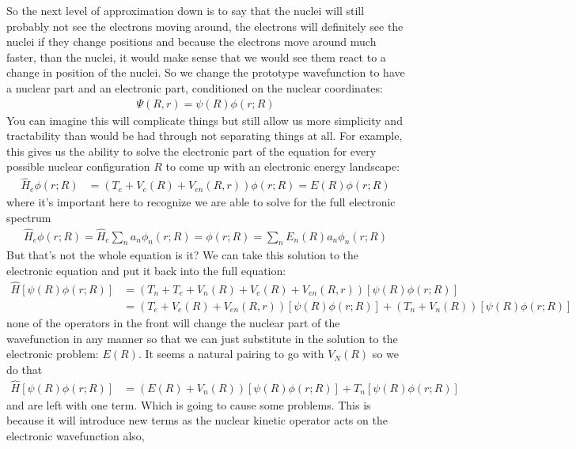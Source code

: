 So the next level of approximation down is to say that the nuclei will still probably not see the electrons moving around, the electrons will definitely see the nuclei if they change positions and because the electrons move around much faster, than the nuclei, it would make sense that we would see them react to a change in position of the nuclei.  So we change the prototype wavefunction to have a nuclear part and an electronic part, conditioned on the nuclear coordinates:
\begin{align*}
	\Psi(R, r) = \psi(R) \phi(r;R)
\end{align*}
You can imagine this will complicate things but still allow us more simplicity and tractability than would be had through not separating things at all.  For example, this gives us the ability to solve the electronic part of the equation for every possible nuclear configuration $R$ to come up with an electronic energy landscape:
\begin{align*}
	\hat{H}_e\phi(r;R) &= ( T_e  + V_e (R)  +  V_{en} (R, r) )\phi(r;R) = E(R) \phi(r;R)
\end{align*}
where it's important here to recognize we are able to solve for the full electronic spectrum
\begin{align*}
	\hat{H}_e\phi(r;R) = \hat{H}_e\sum_{n}a_n \phi_n(r;R)  = \phi(r;R) = \sum_{n} E_n(R) a_n \phi_n(r;R)
\end{align*}
But that's not the whole equation is it?  We can take this solution to the electronic equation and put it back into the full equation:
\begin{align*}
	\hat{H}\left[ \psi(R) \phi(r;R) \right] &= \left(  T_n + T_e  + V_n(R) + V_e (R)  +  V_{en} (R, r) \right)\left[ \psi(R) \phi(r;R) \right] \\
	&= \left( T_e + V_e (R)  +  V_{en} (R, r) \right)\left[ \psi(R) \phi(r;R) \right] + \left(  T_n + V_n(R) \right)\left[ \psi(R) \phi(r;R) \right]
\end{align*}
none of the operators in the front will change the nuclear part of the wavefunction in any manner so that we can just substitute in the solution to the electronic problem: $E(R)$.  It seems a natural pairing to go with $V_N(R)$ so we do that
\begin{align*}
	\hat{H}\left[ \psi(R) \phi(r;R) \right] &= \left( E(R) + V_n(R)  \right)\left[ \psi(R) \phi(r;R) \right] + T_n \left[ \psi(R) \phi(r;R) \right]
\end{align*}
and are left with one term.  Which is going to cause some problems.  This is because it will introduce new terms as the nuclear kinetic operator acts on the electronic wavefunction also,
